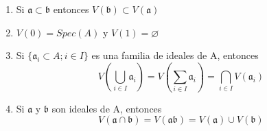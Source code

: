 \documentclass{article}
\begin{document}
\begin{lema}{}{}
    \begin{enumerate}
        \item Si $\mathfrak{a} \subset \mathfrak{b}$ entonces $V(\mathfrak{b}) \subset V(\mathfrak{a})$
        \item $V(0)=Spec(A)$ y $V(1)=\varnothing$
        \item Si $\{\mathfrak{a}_{i} \subset A ; i\in I\}$ es una familia de ideales de A, entonces 
        $$V\left( \bigcup_{i\in I} \mathfrak{a}_i\right) 
        = V\left( \sum_{i\in I}\mathfrak{a}_i\right) 
        = \bigcap_{i\in I} V(\mathfrak{a}_i)$$
        \item Si $\mathfrak{a}$ y $\mathfrak{b}$ son ideales de A, entonces
        $$V(\mathfrak{a}\cap \mathfrak{b}) = V(\mathfrak{a} \mathfrak{b}) = V(\mathfrak{a})\cup V(\mathfrak{b}) $$
    \end{enumerate}
\end{lema}
\end{document}
